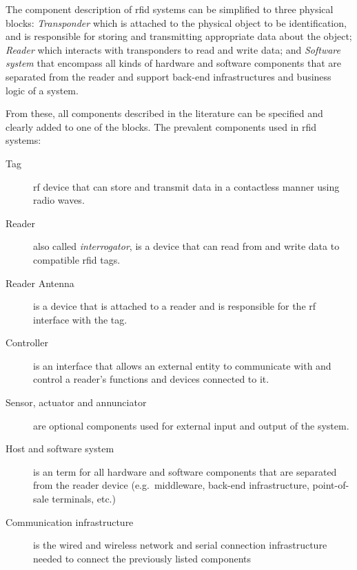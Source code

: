 The component description of \ac{rfid} systems can be simplified to three physical blocks: \emph{Transponder} which is attached to the physical object to be identification, and is responsible for storing and transmitting appropriate data about the object; \emph{Reader} which interacts with transponders to read and write data; and \emph{Software system} that encompass all kinds of hardware and software components that are separated from the reader and support back-end infrastructures and business logic of a system.

From these, all components described in the literature can be specified and clearly added to one of the blocks.
The prevalent components used in \ac{rfid} systems:

\begin{description}
    \item[Tag] \ac{rf} device that can store and transmit data in a contactless manner using radio waves.
    \item[Reader] also called \emph{interrogator}, is a device that can read from and write data to compatible \ac{rfid} tags.
    \item[Reader Antenna] is a device that is attached to a reader and is responsible for the \ac{rf} interface with the tag.
    \item[Controller] is an interface that allows an external entity to communicate with and control a reader's functions and devices connected to it.
    \item[Sensor, actuator and annunciator] are optional components used for external input and output of the system.
    \item[Host and software system] is an term for all hardware and software components that are separated from the reader device (e.g.\ middleware, back-end infrastructure, point-of-sale terminals, etc.)
    \item[Communication infrastructure] is the wired and wireless network and serial connection infrastructure needed to connect the previously listed components
\end{description}


